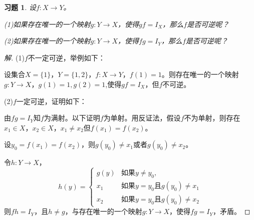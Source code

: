 \documentclass{article}
\begin{document}
\begin{CJK}{UTF8}{gbsn}
\newtheorem*{Ex}{习题}
\begin{Ex}
  设$f:X\to Y$。
  
  (1)如果存在唯一的一个映射$g:Y\to X$，使得$gf=I_X$，那么$f$是否可逆呢？

  (2)如果存在唯一的一个映射$g:Y\to X$，使得$fg=I_Y$，那么$f$是否可逆呢？
\end{Ex}
\begin{proof}[解]

  (1)$f$不一定可逆，举例如下：

  设集合$X=\{1\}$，$Y=\{1,2\}$，$f:X\to Y$，$f(1)=1$。则存在唯一的一个映射$g:Y\to X$，$g(1)=1,g(2)=1$,使得$gf=I_X$，但$f$不可逆。


  (2)$f$一定可逆，证明如下：

  由$fg=I_Y$知$f$为满射。以下证明$f$为单射。用反证法，假设$f$不为单射，则存在$x_1\in X$，$x_2\in X$，$x_1\neq x_2$但$f(x_1)=f(x_2)$。

  设$y_0=f(x_1)=f(x_2)$，则$g(y_0)\neq x_1$或者$g(y_0)\neq x_2$。

  令$h:Y\to X$，
  \[h(y)=\begin{cases}
      g(y) &\text{如果} y \neq y_0,\\
      x_1 &\text{如果} y = y_0\text{且} g(y_0) \neq x_1\\
      x_2 &\text{如果} y= y_0 \text{且} g(y_0) \neq x_2
    \end{cases}
  \]
  则$fh=I_Y$，且$h\neq g$，与存在唯一的一个映射$g:Y\to X$，使得$fg=I_Y$，矛盾。
\end{proof}


\end{CJK}
\end{document}
